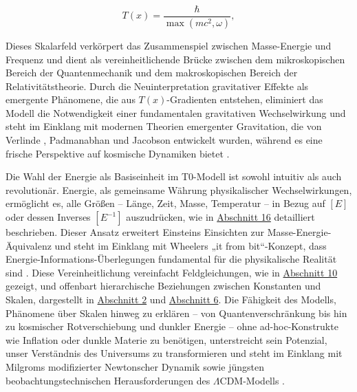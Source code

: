 \documentclass[twocolumn,aps,prl]{revtex4-2}
\begin{document}
	\begin{equation}
		T(x) = \frac{\hbar}{\max(mc^2, \omega)}, \label{eq:intrinsic_time}
	\end{equation}
	
	Dieses Skalarfeld verkörpert das Zusammenspiel zwischen Masse-Energie und Frequenz und dient als vereinheitlichende Brücke zwischen dem mikroskopischen Bereich der Quantenmechanik und dem makroskopischen Bereich der Relativitätstheorie. Durch die Neuinterpretation gravitativer Effekte als emergente Phänomene, die aus $T(x)$-Gradienten entstehen, eliminiert das Modell die Notwendigkeit einer fundamentalen gravitativen Wechselwirkung und steht im Einklang mit modernen Theorien emergenter Gravitation, die von Verlinde \cite{Verlinde2011}, Padmanabhan \cite{Padmanabhan2012} und Jacobson \cite{Jacobson1995} entwickelt wurden, während es eine frische Perspektive auf kosmische Dynamiken bietet \cite{pascher_emergente_2025, pascher_part1_2025}.
	
	Die Wahl der Energie als Basiseinheit im T0-Modell ist sowohl intuitiv als auch revolutionär. Energie, als gemeinsame Währung physikalischer Wechselwirkungen, ermöglicht es, alle Größen – Länge, Zeit, Masse, Temperatur – in Bezug auf $[E]$ oder dessen Inverses $[E^{-1}]$ auszudrücken, wie in \hyperref[sec:conversions]{Abschnitt 16} detailliert beschrieben. Dieser Ansatz erweitert Einsteins Einsichten zur Masse-Energie-Äquivalenz \cite{Einstein1905b} und steht im Einklang mit Wheelers „it from bit“-Konzept, dass Energie-Informations-Überlegungen fundamental für die physikalische Realität sind \cite{Wheeler1990}. Diese Vereinheitlichung vereinfacht Feldgleichungen, wie in \hyperref[sec:field_equations]{Abschnitt 10} gezeigt, und offenbart hierarchische Beziehungen zwischen Konstanten und Skalen, dargestellt in \hyperref[sec:hierarchy]{Abschnitt 2} und \hyperref[sec:length_scales]{Abschnitt 6}. Die Fähigkeit des Modells, Phänomene über Skalen hinweg zu erklären – von Quantenverschränkung bis hin zu kosmischer Rotverschiebung und dunkler Energie – ohne ad-hoc-Konstrukte wie Inflation \cite{Guth1981} oder dunkle Materie \cite{Rubin1980} zu benötigen, unterstreicht sein Potenzial, unser Verständnis des Universums zu transformieren \cite{pascher_energiedynamik_2025} und steht im Einklang mit Milgroms modifizierter Newtonscher Dynamik \cite{Milgrom1983} sowie jüngsten beobachtungstechnischen Herausforderungen des $\Lambda\text{CDM}$-Modells \cite{Riess2016}.
	
\end{document}

